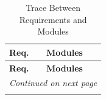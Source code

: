 \documentclass[12pt, titlepage]{article}
\begin{document}
\begin{longtable}{p{} p{}}
  \caption{Trace Between Requirements and Modules} \label{TblRT} \\
  
  \toprule
  \textbf{Req.} & \textbf{Modules} \\
  \midrule
  \endfirsthead
  
  \toprule
  \textbf{Req.} & \textbf{Modules} \\
  \midrule
  \endhead
  
  \midrule
  \multicolumn{2}{r}{\textit{Continued on next page}} \\
  \midrule
  \endfoot
  
  \bottomrule
  \endlastfoot
  

\end{longtable}
\end{document}
